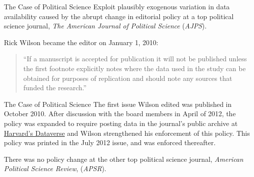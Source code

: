 \documentclass{beamer}
\begin{document}
\begin{frame}{The Case of Political Science}
Exploit plausibly exogenous variation in data availability caused by the abrupt change in editorial policy at a top political science journal, \textit{The American Journal of Political Science} (\textit{AJPS}). 

Rick Wilson became the editor on January 1, 2010:
\begin{quote} ``If a manuscript is accepted for publication it will not be published unless the first footnote explicitly notes where the data used in the study can be obtained for purposes of replication and should note any sources that funded the research.''
\end{quote}
\end{frame}

\begin{frame}{The Case of Political Science}
The first issue Wilson edited was published in October 2010. After discussion with the board members in April of 2012, the policy was expanded to require posting data in the journal's public archive at \href{https://thedata.harvard.edu/dvn/dv/ajps}{Harvard's Dataverse} and Wilson strengthened his enforcement of this policy. This policy was printed in the July 2012 issue, and was enforced thereafter.
\vspace{0.25in}

There was no policy change at the other top political science journal, \textit{American Political Science Review}, (\textit{APSR}).
\end{frame}
\end{document}
